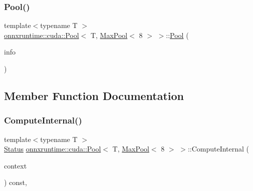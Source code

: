 \subsubsection{\texorpdfstring{Pool()}{Pool()}}
{\footnotesize\ttfamily template$<$typename T $>$ \\
\mbox{\hyperlink{classonnxruntime_1_1cuda_1_1Pool}{onnxruntime\+::cuda\+::\+Pool}}$<$ T, \mbox{\hyperlink{classonnxruntime_1_1MaxPool}{Max\+Pool}}$<$ 8 $>$ $>$\+::\mbox{\hyperlink{classonnxruntime_1_1cuda_1_1Pool}{Pool}} (\begin{DoxyParamCaption}\item[{\mbox{\hyperlink{classonnxruntime_1_1OpKernelInfo}{Op\+Kernel\+Info}}}]{info }\end{DoxyParamCaption})\hspace{0.3cm}{\ttfamily [inline]}}



\subsection{Member Function Documentation}
\mbox{\label{classonnxruntime_1_1cuda_1_1Pool_3_01T_00_01MaxPool_3_018_01_4_01_4_a1f0b209299a68e00ff1187ad7eea3b72}} 
\subsubsection{\texorpdfstring{Compute\+Internal()}{ComputeInternal()}}
{\footnotesize\ttfamily template$<$typename T $>$ \\
\mbox{\hyperlink{classonnxruntime_1_1common_1_1Status}{Status}} \mbox{\hyperlink{classonnxruntime_1_1cuda_1_1Pool}{onnxruntime\+::cuda\+::\+Pool}}$<$ T, \mbox{\hyperlink{classonnxruntime_1_1MaxPool}{Max\+Pool}}$<$ 8 $>$ $>$\+::Compute\+Internal (\begin{DoxyParamCaption}\item[{\mbox{\hyperlink{classonnxruntime_1_1OpKernelContext}{Op\+Kernel\+Context}} $\ast$}]{context }\end{DoxyParamCaption}) const\hspace{0.3cm}{\ttfamily [override]}, {\ttfamily [virtual]}}



